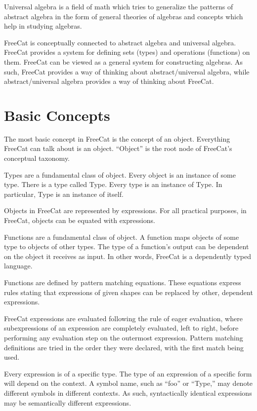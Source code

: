 \documentclass{article}
\begin{document}
Universal algebra is a field of math which tries to generalize the patterns of abstract algebra in the form of general theories of algebras and concepts which help in studying algebras.

FreeCat is conceptually connected to abstract algebra and universal algebra. FreeCat provides a system for defining sets (types) and operations (functions) on them. FreeCat can be viewed as a general system for constructing algebras. As such, FreeCat provides a way of thinking about abstract/universal algebra, while abstract/universal algebra provides a way of thinking about FreeCat.

\section{Basic Concepts}

The most basic concept in FreeCat is the concept of an object. Everything FreeCat can talk about is an object. ``Object'' is the root node of FreeCat's conceptual taxonomy.

Types are a fundamental class of object. Every object is an instance of some type. There is a type called Type. Every type is an instance of Type. In particular, Type is an instance of itself.

Objects in FreeCat are represented by expressions. For all practical purposes, in FreeCat, objects can be equated with expressions.

Functions are a fundamental class of object. A function maps objects of some type to objects of other types. The type of a function's output can be dependent on the object it receives as input. In other words, FreeCat is a dependently typed language.

Functions are defined by pattern matching equations. These equations express rules stating that expressions of given shapes can be replaced by other, dependent expressions.

FreeCat expressions are evaluated following the rule of eager evaluation, where subexpressions of an expression are completely evaluated, left to right, before performing any evaluation step on the outermost expression. Pattern matching definitions are tried in the order they were declared, with the first match being used.

Every expression is of a specific type. The type of an expression of a specific form will depend on the context. A symbol name, such as ``foo'' or ``Type,'' may denote different symbols in different contexts. As such, syntactically identical expressions may be semantically different expressions.
\end{document}
